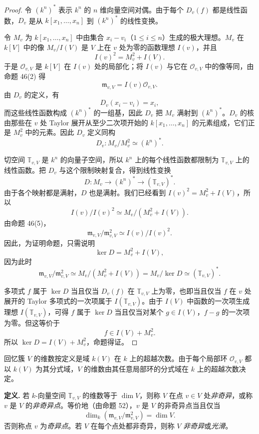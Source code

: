 \begin{proof}
	令 $(k^n)^*$ 表示 $k^n$ 的 $n$ 维向量空间对偶。由于每个 $D_v(f)$ 都是线性函数，$D_v$ 是从 $k[x_1,\ldots,x_n]$ 到 $(k^n)^*$ 的线性变换。
	
	令 $M_v$ 为 $k[x_1,\ldots,x_n]$ 中由集合 $x_i-v_i$（$1\le i\le n$）生成的极大理想。$M_v$ 在 $k[V]$ 中的像 $M_v/I(V)$ 是 $V$ 上在 $v$ 处为零的函数理想 $I(v)$，并且
	\[
	I(v)^2=M_v^2+I(V).
	\]
	于是 $\mathcal O_{v,V}$ 是 $k[V]$ 在 $I(v)$ 处的局部化；将 $I(v)$ 与它在 $\mathcal O_{v,V}$ 中的像等同，由命题 46(2) 得
	\[
	\mathfrak m_{v,V}=I(v)\mathcal O_{v,V}.
	\]
	由 $D_v$ 的定义，有
	\[
	D_v(x_i-v_i)=x_i,
	\]
	而这些线性函数构成 $(k^n)^*$ 的一组基，因此 $D_v$ 把 $M_v$ 满射到 $(k^n)^*$。$D_v$ 的核由那些在 $v$ 处 Taylor 展开从至少二次项开始的 $k[x_1,\ldots,x_n]$ 的元素组成，它们正是 $M_v^2$ 中的元素。因此 $D_v$ 定义同构
	\[
	D_v:M_v/M_v^2\simeq (k^n)^*.
	\]
	
	切空间 $\mathbb T_{v,V}$ 是 $k^n$ 的向量子空间，所以 $k^n$ 上的每个线性函数都限制为 $\mathbb T_{v,V}$ 上的线性函数。把 $D_v$ 与这个限制映射复合，得到线性变换
	\[
	D:M_v\longrightarrow (k^n)^*\longrightarrow (\mathbb T_{v,V})^*.
	\]
	由于各个映射都是满射，$D$ 也是满射。我们已经看到 $I(v)^2=M_v^2+I(V)$，所以
	\[
	I(v)/I(v)^2\simeq M_v/(M_v^2+I(V)).
	\]
	由命题 46(5)，
	\[
	\mathfrak m_{v,V}/\mathfrak m_{v,V}^2\simeq I(v)/I(v)^2.
	\]
	因此，为证明命题，只需说明
	\[
	\ker D=M_v^2+I(V),
	\]
	因为此时
	\[
	\mathfrak m_{v,V}/\mathfrak m_{v,V}^2
	\simeq M_v/(M_v^2+I(V))
	=M_v/\ker D
	\simeq(\mathbb T_{v,V})^*.
	\]
	
	多项式 $f$ 属于 $\ker D$ 当且仅当 $D_v(f)$ 在 $\mathbb T_{v,V}$ 上为零，也即当且仅当 $f$ 在 $v$ 处展开的 Taylor 多项式的一次项属于 $I(\mathbb T_{v,V})$。由于 $I(V)$ 中函数的一次项生成理想 $I(\mathbb T_{v,V})$，可得 $f$ 属于 $\ker D$ 当且仅当对某个 $g\in I(V)$，$f-g$ 的一次项为零。但这等价于
	\[
	f\in I(V)+M_v^2.
	\]
	所以 $\ker D=I(V)+M_v^2$，命题得证。
\end{proof}

回忆簇 $V$ 的维数按定义是域 $k(V)$ 在 $k$ 上的超越次数。由于每个局部环 $\mathcal O_{v,V}$ 都以 $k(V)$ 为其分式域，$V$ 的维数由其任意局部环的分式域在 $k$ 上的超越次数决定。

\noindent\textbf{定义.} 若 $k$-向量空间 $\mathbb T_{v,V}$ 的维数等于 $\dim V$，则称 $V$ 在点 $v\in V$ 处\emph{非奇异}，或称 $v$ 是 $V$ 的\emph{非奇异点}。等价地（由命题 52），$v$ 是 $V$ 的非奇异点当且仅当
\[
\dim_k(\mathfrak m_{v,V}/\mathfrak m_{v,V}^2)=\dim V.
\]
否则称点 $v$ 为\emph{奇异点}。若 $V$ 在每个点处都非奇异，则称 $V$ \emph{非奇异}或\emph{光滑}。

